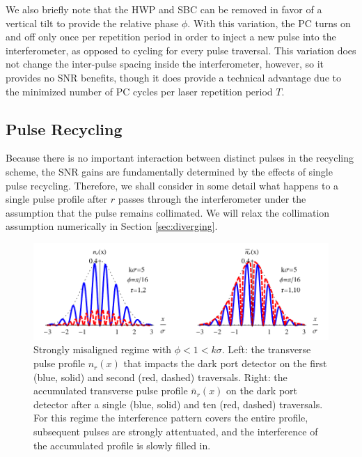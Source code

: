 We also briefly note that the HWP and SBC can be removed in favor of a vertical tilt to provide the relative phase $\phi$.  With this variation, the PC turns on and off only once per repetition period in order to inject a new pulse into the interferometer, as opposed to cycling for every pulse traversal.  This variation does not change the inter-pulse spacing inside the interferometer, however, so it provides no SNR benefits, though it does provide a technical advantage due to the minimized number of PC cycles per laser repetition period $T$.

\subsection{Pulse Recycling}
Because there is no important interaction between distinct pulses in the recycling scheme, the SNR gains are fundamentally determined by the effects of single pulse recycling.  Therefore, we shall consider in some detail what happens to a single pulse profile after $r$ passes through the interferometer under the assumption that the pulse remains collimated.  We will relax the collimation assumption numerically in Section \ref{sec:diverging}. 

\begin{figure}[th]
  \begin{center}
    \centerline{\includegraphics[width=6in]{PulsedRecycling/Figures/beam1.pdf}}
  \end{center}
  \caption[Interference pattern for recycled weak value measurement with a large mirror tilt.]{Strongly misaligned regime with $\phi < 1 < k\sigma$.  Left: the transverse pulse profile $n_r(x)$ that impacts the dark port detector on the first (blue, solid) and second (red, dashed) traversals.  Right: the accumulated transverse pulse profile $\bar{n}_r(x)$ on the dark port detector after a single (blue, solid) and ten (red, dashed) traversals.  For this regime the interference pattern covers the entire profile, subsequent pulses are strongly attentuated, and the interference of the accumulated profile is slowly filled in. }
  \label{fig:beam1}
\end{figure}

